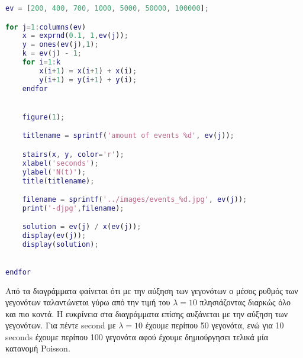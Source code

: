\documentclass[12pt]{article}
\begin{document}
\begin{lstlisting}[language=Matlab]
ev = [200, 400, 700, 1000, 5000, 50000, 100000];

for j=1:columns(ev)
	x = exprnd(0.1, 1,ev(j));
	y = ones(ev(j),1);
	k = ev(j) - 1;
	for i=1:k
		x(i+1) = x(i+1) + x(i);
		y(i+1) = y(i+1) + y(i);
	endfor


	figure(1); 

	titlename = sprintf('amount of events %d', ev(j));

	stairs(x, y, color='r');
	xlabel('seconds');
	ylabel('N(t)');
	title(titlename);

	filename = sprintf('../images/events_%d.jpg', ev(j));
	print('-djpg',filename);

	solution = ev(j) / x(ev(j)); 
	display(ev(j));
	display(solution);

	
endfor

\end{lstlisting}

Από τα διαγράμματα φαίνεται ότι με την αύξηση των γεγονότων ο μέσος ρυθμός των γεγονότων
ταλαντώνεται γύρω από την τιμή του $\lambda = 10$ πλησιάζοντας διαρκώς όλο και πιο κοντά.
Η ευκρίνεια στα διαγράμματα επίσης αυξάνεται με την αύξηση των γεγονότων. Για πέντε second 
με $\lambda = 10$ έχουμε περίπου 50 γεγονότα, ενώ για 10 seconds έχουμε περίπου 100 γεγονότα 
αφού έχουμε δημιούργησει τελικά μία κατανομή Poisson.
\end{document}

